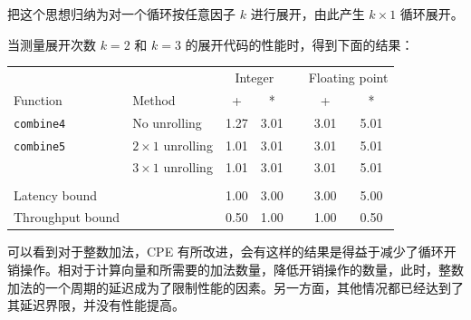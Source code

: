 把这个思想归纳为对一个循环按任意因子 $k$ 进行展开，由此产生 $k \times 1$ 循环展开。

当测量展开次数 $k = 2$ 和 $k = 3$ 的展开代码的性能时，得到下面的结果：

\begin{table}[!ht]
    \centering
    \begin{tabular}{llccccc}
        \toprule
        & & \multicolumn{2}{c}{Integer} & & \multicolumn{2}{c}{Floating point} \\
        \cmidrule{3-4} \cmidrule{6-7}
        Function & Method & + & * & & + & * \\
        \midrule
        \texttt{combine4} & No unrolling & 1.27 & 3.01 & & 3.01 & 5.01 \\
        \texttt{combine5} & $2 \times 1$ unrolling & 1.01 & 3.01 & & 3.01 & 5.01 \\
                          & $3 \times 1$ unrolling & 1.01 & 3.01 & & 3.01 & 5.01 \\
        \\
        Latency bound & & 1.00 & 3.00 & & 3.00 & 5.00 \\
        Throughput bound & & 0.50 & 1.00 & & 1.00 & 0.50 \\
        \bottomrule
    \end{tabular}
\end{table}

可以看到对于整数加法，CPE 有所改进，会有这样的结果是得益于减少了循环开销操作。相对于计算向量和所需要的加法数量，降低开销操作的数量，此时，整数加法的一个周期的延迟成为了限制性能的因素。另一方面，其他情况都已经达到了其延迟界限，并没有性能提高。

